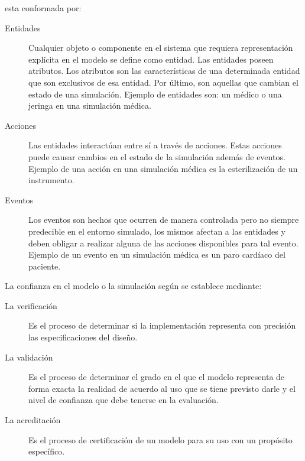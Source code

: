  esta conformada por:

\begin{description}

\item[Entidades] Cualquier objeto o componente en el sistema que requiera
	representación explícita en el modelo se define como
	entidad\cite{banks2000dm}. Las entidades poseen atributos. Los atributos
	son las características de una determinada entidad que son exclusivos de
	esa entidad. Por último, son aquellas que cambian el estado de una
	simulación. Ejemplo de entidades son: un médico o una jeringa en una
	simulación médica.

\item[Acciones] Las entidades interactúan entre sí a través de acciones. Estas
	acciones puede causar cambios en el estado de la simulación además de
	eventos. Ejemplo de una acción en una simulación médica es la
	esterilización de un instrumento.

\item[Eventos] Los eventos son hechos que ocurren de manera controlada pero no
	siempre predecible en el entorno simulado, los mismos afectan a las
	entidades y deben obligar a realizar alguna de las acciones disponibles
	para tal evento. Ejemplo de un evento en un simulación médica es un paro
	cardíaco del paciente.

\end{description}

La confianza en el modelo o la simulación según\cite{DoDSysEng2001} se establece
mediante:

\begin{description}

\item[La verificación] Es el proceso de determinar si la implementación
	representa con precisión las especificaciones del diseño. 

\item[La validación] Es el proceso de determinar el grado en el que el modelo
	representa de forma exacta la realidad de acuerdo al uso que se tiene
	previsto darle y el nivel de confianza que debe tenerse en la
	evaluación.

\item[La acreditación] Es el proceso de certificación de un modelo para su uso
	con un propósito específico.

\end{description}



